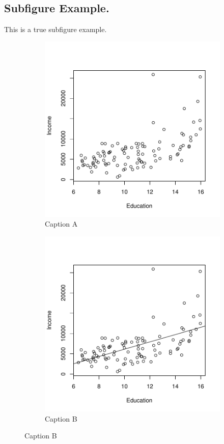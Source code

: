 \subsection{Subfigure Example.}
This is a true subfigure example.
\begin{figure}[h]
    \begin{subfigure}{.55\textwidth}
      \centering
      \includegraphics[width=.8\linewidth]{chap_2_figures/example_1}
      \caption{Caption A}
      \label{fig:third_fig_1}
    \end{subfigure}
    \begin{subfigure}{.55\textwidth}
      \centering
      \includegraphics[width=.8\linewidth]{chap_2_figures/example_2}
      \caption{Caption B}
      \label{fig:third_fig_2}
    \end{subfigure}
\end{figure}